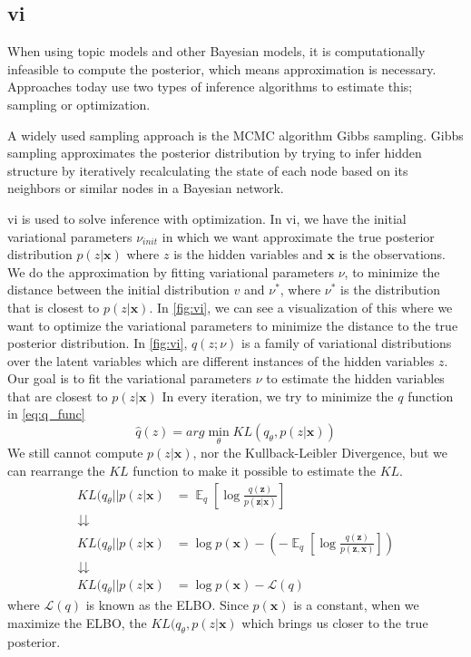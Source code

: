 \subsection{\acrlong{vi}}
When using topic models and other Bayesian models, it is computationally infeasible to compute the posterior, which means approximation is necessary. 
Approaches today use two types of inference algorithms to estimate this; sampling or optimization.

A widely used sampling approach is the MCMC algorithm Gibbs sampling.
Gibbs sampling approximates the posterior distribution by trying to infer hidden structure by iteratively recalculating the state of each node based on its neighbors or similar nodes in a Bayesian network.

\gls{vi} is used to solve inference with optimization.
In \gls{vi}, we have the initial variational parameters $\nu_{init}$ in which we want approximate the true posterior distribution $p(z|\textbf{x})$ where $z$ is the hidden variables and $\textbf{x}$ is the observations.
We do the approximation by fitting variational parameters $\nu$, to minimize the distance between the initial distribution $v$ and $\nu^*$, where $\nu^*$ is the distribution that is closest to $p(z|\textbf{x})$.
In \autoref{fig:vi}, we can see a visualization of this where we want to optimize the variational parameters to minimize the distance to the true posterior distribution.
In \autoref{fig:vi}, $q(z; \nu)$ is a family of variational distributions over the latent variables which are different instances of the hidden variables $z$.
Our goal is to fit the variational parameters $\nu$ to estimate the hidden variables that are closest to $p(z|\textbf{x})$
In every iteration, we try to minimize the $q$ function in \autoref{eq:q_func} 
\begin{equation}\label{eq:q_func}
	\hat{q}(z) = arg \min_{\theta} K\!L(q_\theta, p(z|\textbf{x}))
\end{equation}
We still cannot compute $p(z|\textbf{x})$, nor the Kullback-Leibler Divergence, but we can rearrange the $K\!L$ function to make it possible to estimate the $K\!L$.
\begin{align}
	K\!L(q_\theta || p(z|\textbf{x}) &= \mathop{\mathbb{E}}_{q}[\log\frac{q(\textbf{z})}{p(\textbf{z}|\textbf{x})}]\\
	\downdownarrows \\
	K\!L(q_\theta || p(z|\textbf{x}) &= \log p(\textbf{x}) - (-\mathop{\mathbb{E}}_{q}[\log\frac{q(\textbf{z})}{p(\textbf{z},\textbf{x})}]) \\
	\downdownarrows \\
	K\!L(q_\theta || p(z|\textbf{x}) &= \log p(\textbf{x}) - \mathcal{L}(q)
\end{align}
where $\mathcal{L}(q)$ is known as the ELBO.
Since $p(\textbf{x})$ is a constant, when we maximize the ELBO, the $K\!L(q_\theta, p(z|\textbf{x})$ which brings us closer to the true posterior.

